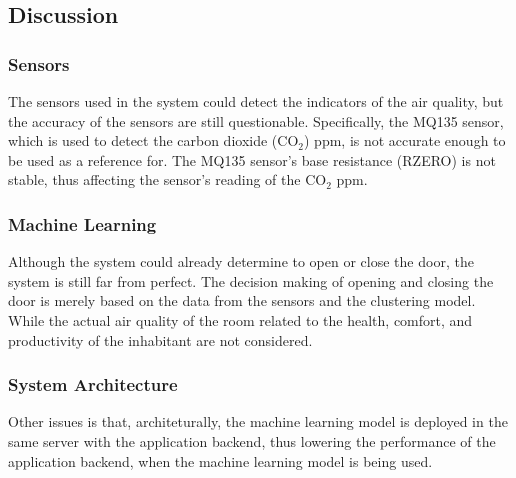 \subsection{Discussion}
\subsubsection{Sensors}
The sensors used in the system could detect the
indicators of the air quality, but the accuracy
of the sensors are still questionable.
Specifically, the MQ135 sensor, which is used to
detect the carbon dioxide (CO$_2$) ppm, is not
accurate enough to be used as a reference for.
The MQ135 sensor's base resistance (RZERO) is
not stable, thus affecting the sensor's
reading of the CO$_2$ ppm.

\subsubsection{Machine Learning}
Although the system could already determine to open
or close the door, the system is still far from
perfect. The decision making of opening and closing
the door is merely based on the data from the
sensors and the clustering model. While the actual
air quality of the room related to the health,
comfort, and productivity of the inhabitant are not
considered.

\subsubsection{System Architecture}
Other issues is that, architeturally, the machine
learning model is deployed in the same server with
the application backend, thus lowering the
performance of the application backend, when the
machine learning model is being used.